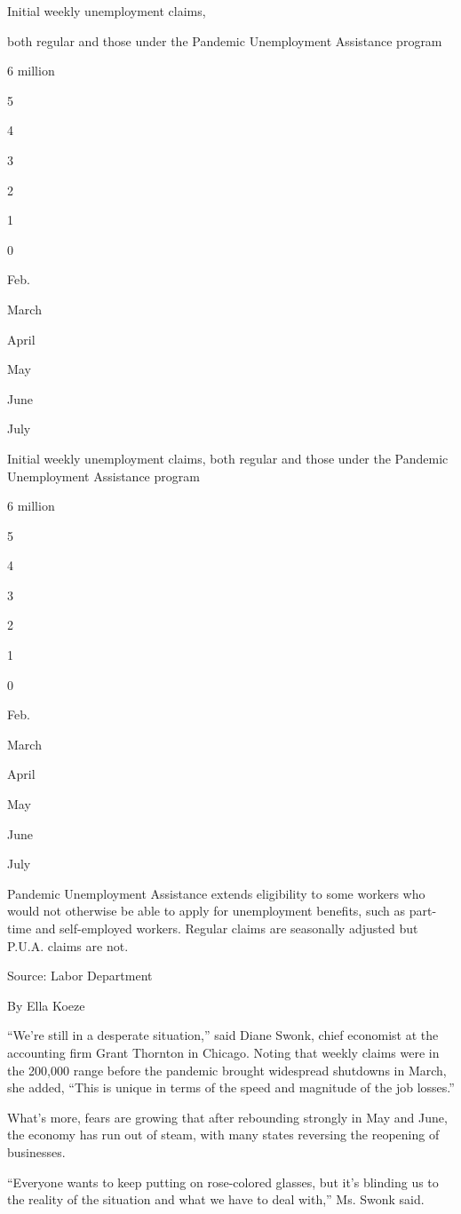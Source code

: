 Initial weekly unemployment claims,

both regular and those under the Pandemic Unemployment Assistance
program

6 million

5

4

3

2

1

0

Feb.

March

April

May

June

July

Initial weekly unemployment claims, both regular and those under the
Pandemic Unemployment Assistance program

6 million

5

4

3

2

1

0

Feb.

March

April

May

June

July

Pandemic Unemployment Assistance extends eligibility to some workers who
would not otherwise be able to apply for unemployment benefits, such as
part-time and self-employed workers. Regular claims are seasonally
adjusted but P.U.A. claims are not.

Source: Labor Department

By Ella Koeze

``We're still in a desperate situation,'' said Diane Swonk, chief
economist at the accounting firm Grant Thornton in Chicago. Noting that
weekly claims were in the 200,000 range before the pandemic brought
widespread shutdowns in March, she added, ``This is unique in terms of
the speed and magnitude of the job losses.''

What's more, fears are growing that after rebounding strongly in May and
June, the economy has run out of steam, with many states reversing the
reopening of businesses.

``Everyone wants to keep putting on rose-colored glasses, but it's
blinding us to the reality of the situation and what we have to deal
with,'' Ms. Swonk said.

